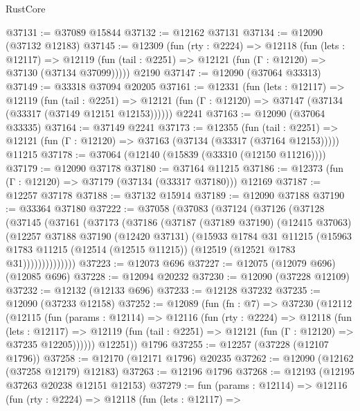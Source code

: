\begin{lexlean}{RustCore}
\begin{coremodule}
@37131 := @37089 @15844
@37132 := @12162 @37131
@37134 := @12090 (@37132 @12183)
@37145 := @12309
    (fun (rty : @2224) =>
    @12118
      (fun (lets : @12117) =>
      @12119 (fun (tail : @2251) => @12121 (fun (Γ : @12120) => @37130 (@37134 @37099)))))
    @2190
@37147 := @12090 (@37064 @33313)
@37149 := @33318 @37094 @20205
@37161 := @12331
    (fun (lets : @12117) =>
    @12119
      (fun (tail : @2251) =>
      @12121 (fun (Γ : @12120) => @37147 (@37134 (@33317 (@37149 @12151 @12153))))))
    @2241
@37163 := @12090 (@37064 @33335)
@37164 := @37149 @2241
@37173 := @12355
    (fun (tail : @2251) => @12121 (fun (Γ : @12120) => @37163 (@37134 (@33317 (@37164 @12153)))))
    @11215
@37178 := @37064 (@12140 (@15839 (@33310 (@12150 @11216))))
@37179 := @12090 @37178
@37180 := @37164 @11215
@37186 := @12373 (fun (Γ : @12120) => @37179 (@37134 (@33317 @37180))) @12169
@37187 := @12257 @37178
@37188 := @37132 @15914
@37189 := @12090 @37188
@37190 := @33364 @37180
@37222 := @37058
    (@37083
      (@37124
        (@37126
          (@37128
            (@37145
              (@37161
                (@37173
                  (@37186
                    (@37187
                      (@37189 @37190)
                      (@12415 @37063)
                      (@12257
                        @37188
                        @37190
                        (@12420 @37131)
                        (@15933
                          @1784
                          @31
                          @11215
                          (@15963
                            @1783
                            @11215
                            (@12514 (@12515 @11215))
                            (@12519 (@12521 @1783 @31))))))))))))))
@37223 := @12073 @696
@37227 := @12075 (@12079 @696) (@12085 @696)
@37228 := @12094 @20232
@37230 := @12090 (@37228 @12109)
@37232 := @12132 (@12133 @696)
@37233 := @12128 @37232
@37235 := @12090 (@37233 @12158)
@37252 := @12089
    (fun (fn : @7) =>
    @37230
      (@12112
        (@12115
          (fun (params : @12114) =>
          @12116
            (fun (rty : @2224) =>
            @12118
              (fun (lets : @12117) =>
              @12119 (fun (tail : @2251) => @12121 (fun (Γ : @12120) => @37235 @12205))))))
        @12251))
    @1796
@37255 := @12257 (@37228 (@12107 @1796))
@37258 := @12170 (@12171 @1796) @20235
@37262 := @12090 (@12162 (@37258 @12179) @12183)
@37263 := @12196 @1796
@37268 := @12193 (@12195 @37263 @20238 @12151 @12153)
@37279 := fun (params : @12114) =>
  @12116
    (fun (rty : @2224) =>
    @12118
      (fun (lets : @12117) =>

\end{coremodule}
\end{lexlean}
